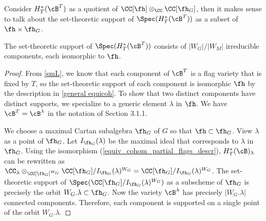 \documentclass[12pt]{amsart}
\begin{document}

Consider $H^{*}_{T}(\cB^T)$ as a quotient of $\CC[\fh]\otimes_\CC \CC[\fh_G]$, then it makes sense to talk about the set-theoretic support of $\Spec(H^{*}_{T}(\cB^T))$ as a subset of $\fh\times \fh_G$. 
\begin{lemma} \label{fixed point flag variety}
    The set-theoretic support of $\Spec(H^{*}_{T}(\cB^T))$ consists of $|W_G|/|W_M|$ irreducible components, each isomorphic to $\fh$. 
\end{lemma}
\begin{proof}
    From \cref{smL}, we know that each component of $\cB^T$ is a flag variety that is fixed by $T$, so the set-theoretic support of each component is isomorphic $\fh$ by the description in \cref{general equicoh}. To show that two distinct components have distinct supports, we specialize to a generic element $\lambda$ in $\fh$. We have $\cB^T= \cB^\lambda$ in the notation of Section 3.1.1.

    We choose a maximal Cartan subalgebra $\fh_G$ of $G$ so that $\fh\subset \fh_G$. View $\lambda$ as a point of $\fh_G$. Let $I_{\fh_G}(\lambda)$ be the maximal ideal that corresponds to $\lambda$ in $\fh_G$. Using the isomorphism (\ref{equiv_cohom_partial_flags_descr}), $H^*_T(\cB)_\lambda$ can be rewritten as $\CC_\lambda\otimes_{\CC[\fh_G]^{W_G}}\CC[\fh_G] /I_{\fh_G}(\lambda)^{W_G}= \CC[\fh_G]/I_{\fh_G}(\lambda)^{W_G}$. The set-theoretic support of $\Spec(\CC[\fh_G]/I_{\fh_G}(\lambda)^{W_G})$ as a subscheme of $\fh_G$ is precisely the orbit $W_G.\lambda\subset \fh_G$. Now the variety $\cB^\lambda$ has precisely $|W_G.\lambda|$ connected components. Therefore, each component is supported on a single point of the orbit $W_G.\lambda$.
\end{proof}


\end{document}
